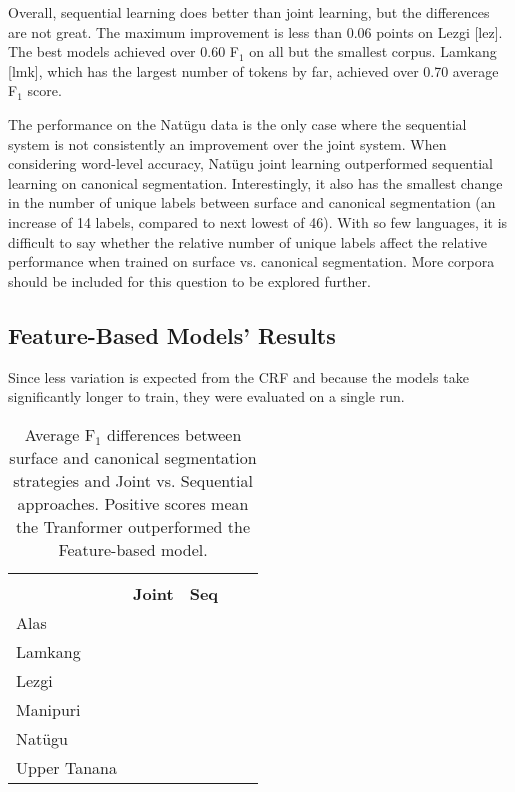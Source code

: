Overall, sequential learning does better than joint learning, but the differences are not great. The maximum improvement is less than 0.06 points on Lezgi [lez]. The best models achieved over 0.60 F$_1$ on all but the smallest corpus. Lamkang [lmk], which has the largest number of tokens by far, achieved over 0.70 average F$_1$ score. 

The performance on the Nat\"ugu data is the only case where the sequential system is not consistently an improvement over the joint system. 
When considering word-level accuracy, Nat\"ugu joint learning outperformed sequential learning on canonical segmentation. Interestingly, it also has the smallest change in the number of unique labels between surface and canonical segmentation (an increase of 14 labels, compared to next lowest of 46). With so few languages, it is difficult to say whether the relative number of unique labels affect the relative performance when trained on surface vs. canonical segmentation. More corpora should be included for this question to be explored further. %
 

\subsection{Feature-Based Models' Results}

Since less variation is expected from the CRF and because the models take significantly longer to train, they were evaluated on a single run. 

\begin{table}
    \centering
    \begin{tabular}{l|cc|cc}
          & \textbf{\multicolumn{2}{c|}{Surface}} & \textbf{\multicolumn{2}{c|}{Canonical}} \\
          & \textbf{Joint} & \textbf{Seq} \\
         \hline
         Alas  &  &   \\
         \hline
         Lamkang  &   &   \\
         \hline
         Lezgi  &  &   \\
         \hline
         Manipuri  &  &    \\
         \hline
         Natügu  &  &   \\
         \hline
         Upper Tanana &  &  \\
    \end{tabular}
    \caption[F$_1$-score Differences between Deep Learning and Feature-based Models]{Average F$_1$ differences between surface and canonical segmentation strategies and Joint vs. Sequential approaches. Positive scores mean the Tranformer outperformed the Feature-based model.}
    \label{tab:segdiffresults}
\end{table}

